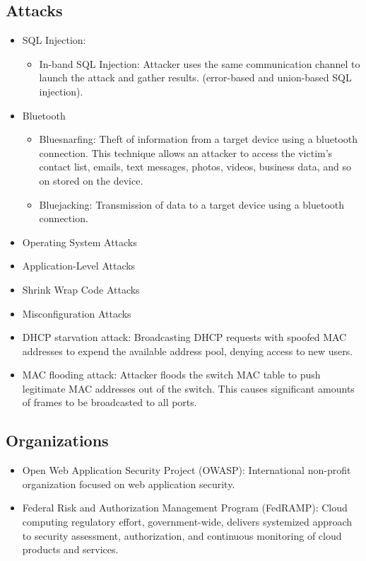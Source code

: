 \subsection{Attacks}
\begin{itemize}
    \item SQL Injection:
    \begin{itemize}
        \item In-band SQL Injection: Attacker uses the same communication channel to launch the attack and gather results. (error-based and union-based SQL injection).
    \end{itemize}
    \item Bluetooth
    \begin{itemize}
        \item Bluesnarfing: Theft of information from a target device using a bluetooth connection. This technique allows an attacker to access the victim's contact list, emails, text messages, photos, videos, business data, and so on stored on the device.
        \item Bluejacking: Transmission of data to a target device using a bluetooth connection.
    \end{itemize}
    \item Operating System Attacks
    \item Application-Level Attacks
    \item Shrink Wrap Code Attacks
    \item Misconfiguration Attacks
    \item DHCP starvation attack: Broadcasting DHCP requests with spoofed MAC addresses to expend the available address pool, denying access to new users.
    \item MAC flooding attack: Attacker floods the switch MAC table to push legitimate MAC addresses out of the switch. This causes significant amounts of frames to be broadcasted to all ports.
\end{itemize}

\subsection{Organizations}
\begin{itemize}
    \item Open Web Application Security Project (OWASP): International non-profit organization focused on web application security.
    \item Federal Risk and Authorization Management Program (FedRAMP): Cloud computing regulatory effort, government-wide, delivers systemized approach to security assessment, authorization, and continuous monitoring of cloud products and services.
\end{itemize}

